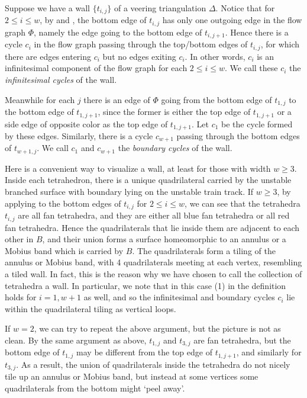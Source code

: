\documentclass[12pt]{amsart}
\theoremstyle{definition}
\numberwithin{equation}{section}
\begin{document}
Suppose we have a wall $\{t_{i,j}\}$ of a veering triangulation $\Delta$. Notice that for $2 \leq i \leq w$, by  and , the bottom edge of $t_{i,j}$ has only one outgoing edge in the flow graph $\Phi$, namely the edge going to the bottom edge of $t_{i,j+1}$. Hence there is a cycle $c_i$ in the flow graph passing through the top/bottom edges of $t_{i,j}$, for which there are edges entering $c_i$ but no edges exiting $c_i$. In other words, $c_i$ is an infinitesimal component of the flow graph for each $2 \leq i \leq w$. We call these $c_i$ the \textit{infinitesimal cycles} of the wall.

Meanwhile for each $j$ there is an edge of $\Phi$ going from the bottom edge of $t_{1,j}$ to the bottom edge of $t_{1,j+1}$, since the former is either the top edge of $t_{1,j+1}$ or a side edge of opposite color as the top edge of $t_{1,j+1}$. Let $c_1$ be the cycle formed by these edges. Similarly, there is a cycle $c_{w+1}$ passing through the bottom edges of $t_{w+1,j}$. We call $c_1$ and $c_{w+1}$ the \textit{boundary cycles} of the wall.

Here is a convenient way to visualize a wall, at least for those with width $w \geq 3$. Inside each tetrahedron, there is a unique quadrilateral carried by the unstable branched surface with boundary lying on the unstable train track. If $w \geq 3$, by applying  to the bottom edges of $t_{i,j}$ for $2 \leq i \leq w$, we can see that the tetrahedra $t_{i,j}$ are all fan tetrahedra, and they are either all blue fan tetrahedra or all red fan tetrahedra. Hence the quadrilaterals that lie inside them are adjacent to each other in $B$, and their union forms a surface homeomorphic to an annulus or a Mobius band which is carried by $B$. The quadrilaterals form a tiling of the annulus or Mobius band, with 4 quadrilaterals meeting at each vertex, resembling a tiled wall. In fact, this is the reason why we have chosen to call the collection of tetrahedra a wall. In particular, we note that in this case (1) in the definition holds for $i=1,w+1$ as well, and so the infinitesimal and boundary cycles $c_i$ lie within the quadrilateral tiling as vertical loops.

If $w=2$, we can try to repeat the above argument, but the picture is not as clean. By the same argument as above, $t_{1,j}$ and $t_{3,j}$ are fan tetrahedra, but the bottom edge of $t_{1,j}$ may be different from the top edge of $t_{1,j+1}$, and similarly for $t_{3,j}$. As a result, the union of quadrilaterals inside the tetrahedra do not nicely tile up an annulus or Mobius band, but instead at some vertices some quadrilaterals from the bottom might `peel away'.
\end{document}
